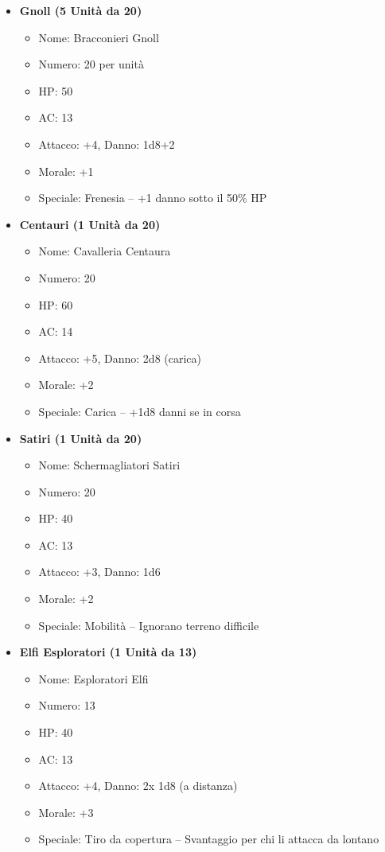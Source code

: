 \documentclass{article}
\begin{document}
\begin{itemize}
  \item \textbf{Gnoll (5 Unità da 20)}
  \begin{itemize}
    \item Nome: Bracconieri Gnoll
    \item Numero: 20 per unità
    \item HP: 50
    \item AC: 13
    \item Attacco: +4, Danno: 1d8+2
    \item Morale: +1
    \item Speciale: Frenesia – +1 danno sotto il 50\% HP
  \end{itemize}

  \item \textbf{Centauri (1 Unità da 20)}
  \begin{itemize}
    \item Nome: Cavalleria Centaura
    \item Numero: 20
    \item HP: 60
    \item AC: 14
    \item Attacco: +5, Danno: 2d8 (carica)
    \item Morale: +2
    \item Speciale: Carica – +1d8 danni se in corsa
  \end{itemize}

  \item \textbf{Satiri (1 Unità da 20)}
  \begin{itemize}
    \item Nome: Schermagliatori Satiri
    \item Numero: 20
    \item HP: 40
    \item AC: 13
    \item Attacco: +3, Danno: 1d6
    \item Morale: +2
    \item Speciale: Mobilità – Ignorano terreno difficile
  \end{itemize}

  \item \textbf{Elfi Esploratori (1 Unità da 13)}
  \begin{itemize}
    \item Nome: Esploratori Elfi
    \item Numero: 13
    \item HP: 40
    \item AC: 13
    \item Attacco: +4, Danno: 2x 1d8 (a distanza)
    \item Morale: +3
    \item Speciale: Tiro da copertura – Svantaggio per chi li attacca da lontano
  \end{itemize}


\end{itemize}
\end{document}
